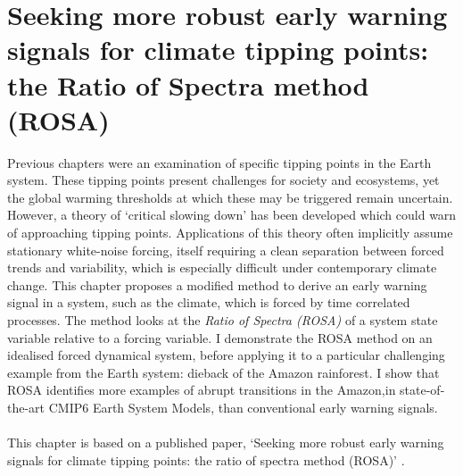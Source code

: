 \chapter{Seeking more robust early warning signals for climate tipping points: the Ratio of Spectra method (ROSA)}
\label{chapter:rosa}
\graphicspath{{ROSA/figs}}



Previous chapters were an examination of specific tipping points in the Earth system.
These tipping points present challenges for society and 
ecosystems, yet the global warming thresholds at which these may be triggered remain uncertain. However,
a theory of `critical slowing down' has been developed which could warn of approaching tipping points. 
Applications of this theory often implicitly assume stationary white-noise forcing,  itself requiring a clean separation
between forced trends and variability, which is especially difficult under contemporary climate change. 
This chapter proposes a modified method to derive an early warning signal in a 
system, such as the climate, which is forced by time correlated processes. 
The method looks at the \emph{Ratio of Spectra (ROSA)} of a system state variable relative to a forcing variable.   
I demonstrate the ROSA method on an idealised forced dynamical system, before applying it 
to a particular challenging example from the Earth system: dieback of the Amazon rainforest.
I show that ROSA identifies more examples of abrupt transitions in the Amazon,in state-of-the-art CMIP6 Earth System Models, than conventional early warning signals.
\\\\
This chapter is based on a published paper, `Seeking more robust early warning signals for climate tipping points: the ratio of spectra method (ROSA)' \parencite{Clarke2023}.

